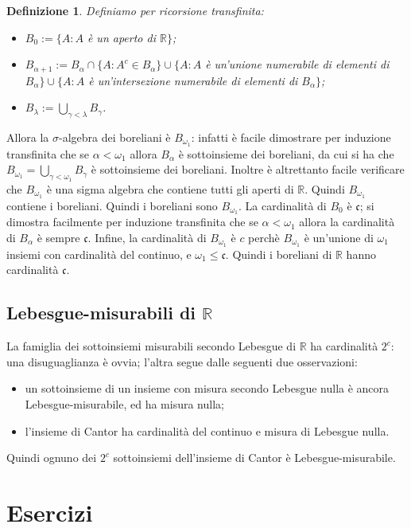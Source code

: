 \documentclass[a4paper,10pt,oneside]{article}
\theoremstyle{plain}
\newtheorem{mydef}[mytheorem]{Definizione}
\theoremstyle{definition}
\theoremstyle{remark}
\begin{document}
\begin{mydef}
Definiamo per ricorsione transfinita:
\begin{itemize}
 \item $B_0:=\{A : A$ è un aperto di $\mathbb R\}$;
 \item $B_{\alpha+1}:=B_\alpha\cap\{A : A^c\in B_\alpha\}\cup\{A : A$ è un'unione numerabile di elementi di $B_\alpha\}\cup\{A : A$ è un'intersezione numerabile di elementi di $B_\alpha\}$;
 \item $B_\lambda:=\bigcup\limits_{\gamma<\lambda}B_\gamma$.
\end{itemize}
\end{mydef}
Allora la $\sigma$-algebra dei boreliani è $B_{\omega_1}$: infatti è facile dimostrare per induzione transfinita che se $\alpha<\omega_1$ allora $B_\alpha$ è sottoinsieme dei boreliani, da cui si ha che $B_{\omega_1}=\bigcup\limits_{\gamma<\omega_1}B_\gamma$ è sottoinsieme dei boreliani. Inoltre è altrettanto facile verificare che $B_{\omega_1}$ è una sigma algebra che contiene tutti gli aperti di $\mathbb R$. Quindi $B_{\omega_1}$ contiene i boreliani. Quindi i boreliani sono $B_{\omega_1}$.
La cardinalità di $B_0$ è $\mathfrak c$; si dimostra facilmente per induzione transfinita che se $\alpha<\omega_1$ allora la cardinalità  di $B_\alpha$ è sempre $\mathfrak c$. Infine, la cardinalità di $B_{\omega_1}$ è $c$ perchè $B_{\omega_1}$ è un'unione di $\omega_1$ insiemi con cardinalità del continuo, e $\omega_1\le \mathfrak c$.
Quindi i boreliani di $\mathbb R$ hanno cardinalità $\mathfrak c$.

\subsection{Lebesgue-misurabili di $\mathbb R$}

La famiglia dei sottoinsiemi misurabili secondo Lebesgue di $\mathbb R$ ha cardinalità $2^c$: una disuguaglianza è ovvia; l'altra segue dalle seguenti due osservazioni:
\begin{itemize}
 \item un sottoinsieme di un insieme con misura secondo Lebesgue nulla è ancora Lebesgue-misurabile, ed ha misura nulla;
 \item l'insieme di Cantor ha cardinalità del continuo e misura di Lebesgue nulla.
\end{itemize}
Quindi ognuno dei $2^c$ sottoinsiemi dell'insieme di Cantor è Lebesgue-misurabile.

\section{Esercizi}
\end{document}
